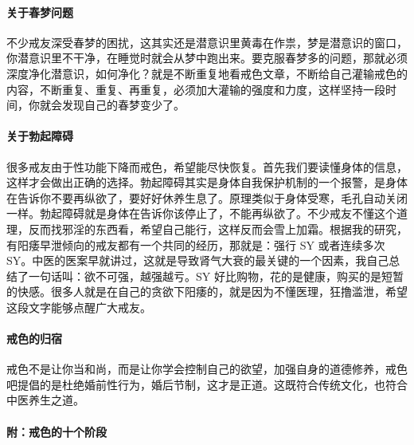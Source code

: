 \documentclass[fontset=founder]{ctexart}
\begin{document}
\paragraph{关于春梦问题}

不少戒友深受春梦的困扰，这其实还是潜意识里黄毒在作祟，梦是潜意识的窗口，你潜意识里不干净，在睡觉时就会从梦中跑出来。要克服春梦多的问题，那就必须深度净化潜意识，如何净化？就是不断重复地看戒色文章，不断给自己灌输戒色的内容，不断重复、重复、再重复，必须加大灌输的强度和力度，这样坚持一段时间，你就会发现自己的春梦变少了。

\paragraph{关于勃起障碍}

很多戒友由于性功能下降而戒色，希望能尽快恢复。首先我们要读懂身体的信息，这样才会做出正确的选择。勃起障碍其实是身体自我保护机制的一个报警，是身体在告诉你不要再纵欲了，要好好休养生息了。原理类似于身体受寒，毛孔自动关闭一样。勃起障碍就是身体在告诉你该停止了，不能再纵欲了。不少戒友不懂这个道理，反而找邪淫的东西看，希望自己能行，这样反而会雪上加霜。根据我的研究，有阳痿早泄倾向的戒友都有一个共同的经历，那就是：强行 SY 或者连续多次 SY。中医的医案早就讲过，这就是导致肾气大衰的最关键的一个因素，我自己总结了一句话叫：欲不可强，越强越亏。SY 好比购物，花的是健康，购买的是短暂的快感。很多人就是在自己的贪欲下阳痿的，就是因为不懂医理，狂撸滥泄，希望这段文字能够点醒广大戒友。

\paragraph{戒色的归宿}

戒色不是让你当和尚，而是让你学会控制自己的欲望，加强自身的道德修养，戒色吧提倡的是杜绝婚前性行为，婚后节制，这才是正道。这既符合传统文化，也符合中医养生之道。

\paragraph{附：戒色的十个阶段}
\end{document}
